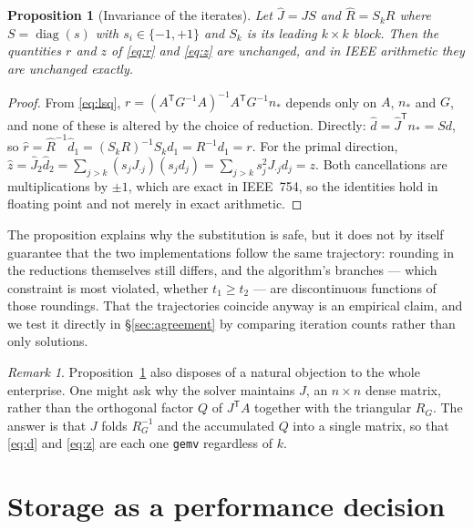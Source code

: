 \documentclass[11pt,a4paper]{article}
\theoremstyle{plain}
\newtheorem{proposition}{Proposition}
\theoremstyle{remark}
\newtheorem*{remark}{Remark}
\newcommand{\T}{^{\mathsf{T}}}
\begin{document}
\begin{proposition}[Invariance of the iterates]
\label{prop:invariance}
Let $\hat{J} = J S$ and $\hat{R} = S_k R$ where $S = \operatorname{diag}(s)$ with
$s_i \in \{-1, +1\}$ and $S_k$ is its leading $k \times k$ block. Then the
quantities $r$ and $z$ of \eqref{eq:r} and \eqref{eq:z} are unchanged, and in
IEEE arithmetic they are unchanged \emph{exactly}.
\end{proposition}

\begin{proof}
From \eqref{eq:lsq}, $r = (A\T G^{-1} A)^{-1} A\T G^{-1} n_\ast$ depends only on
$A$, $n_\ast$ and $G$, and none of these is altered by the choice of reduction.
Directly: $\hat{d} = \hat{J}\T n_\ast = S d$, so
$\hat{r} = \hat{R}^{-1}\hat{d}_1 = (S_k R)^{-1} S_k d_1 = R^{-1} d_1 = r$. For
the primal direction,
$\hat{z} = \hat{J}_2 \hat{d}_2 = \sum_{j > k} (s_j J_{\cdot j})(s_j d_j)
= \sum_{j>k} s_j^2 J_{\cdot j} d_j = z$. Both cancellations are multiplications
by $\pm 1$, which are exact in IEEE~754, so the identities hold in floating point
and not merely in exact arithmetic.
\end{proof}

The proposition explains why the substitution is safe, but it does not by itself
guarantee that the two implementations follow the same trajectory: rounding in
the reductions themselves still differs, and the algorithm's branches --- which
constraint is most violated, whether $t_1 \ge t_2$ --- are discontinuous
functions of those roundings. That the trajectories coincide anyway is an
empirical claim, and we test it directly in \S\ref{sec:agreement} by comparing
iteration counts rather than only solutions.

\begin{remark}
Proposition~\ref{prop:invariance} also disposes of a natural objection to the
whole enterprise. One might ask why the solver maintains $J$, an $n \times n$
dense matrix, rather than the orthogonal factor $Q$ of $J\T A$ together with the
triangular $R_G$. The answer is that $J$ folds $R_G^{-1}$ and the accumulated $Q$
into a single matrix, so that \eqref{eq:d} and \eqref{eq:z} are each one
\texttt{gemv} regardless of $k$.
\end{remark}

\section{Storage as a performance decision}
\label{sec:packed}
\end{document}
